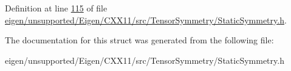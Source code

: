 Definition at line \hyperlink{eigen_2unsupported_2_eigen_2_c_x_x11_2src_2_tensor_symmetry_2_static_symmetry_8h_source_l00115}{115} of file \hyperlink{eigen_2unsupported_2_eigen_2_c_x_x11_2src_2_tensor_symmetry_2_static_symmetry_8h_source}{eigen/unsupported/\+Eigen/\+C\+X\+X11/src/\+Tensor\+Symmetry/\+Static\+Symmetry.\+h}.



The documentation for this struct was generated from the following file\+:\begin{DoxyCompactItemize}
\item 
eigen/unsupported/\+Eigen/\+C\+X\+X11/src/\+Tensor\+Symmetry/\+Static\+Symmetry.\+h\end{DoxyCompactItemize}
